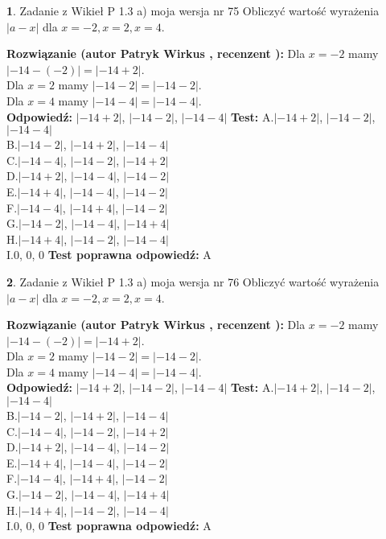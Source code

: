 \documentclass[12pt, a4paper]{article}
\theoremstyle{definition} %
\newtheorem{zad}{}
\newcommand{\zadStart}[1]{\begin{zad}#1\newline}
\newcommand{\zadStop}{\end{zad}}
\newcommand{\rozwStart}[2]{\noindent \textbf{Rozwiązanie (autor #1 , recenzent #2): }\newline}
\newcommand{\rozwStop}{\newline}
\newcommand{\odpStart}{\noindent \textbf{Odpowiedź:}\newline}
\newcommand{\odpStop}{\newline}
\newcommand{\testStart}{\noindent \textbf{Test:}\newline}
\newcommand{\testStop}{\newline}
\newcommand{\kluczStart}{\noindent \textbf{Test poprawna odpowiedź:}\newline}
\newcommand{\kluczStop}{\newline}
\begin{document}
\zadStart{Zadanie z Wikieł P 1.3 a) moja wersja nr 75}
Obliczyć wartość wyrażenia $|a - x|$ dla $x=-2,x=2,x=4$.
\zadStop
\rozwStart{Patryk Wirkus}{}
Dla $x = -2$ mamy $|-14 - (-2)| = |-14 + 2|$.\\
Dla $x = 2$ mamy $|-14 - 2| = |-14 - 2|$.\\
Dla $x = 4$ mamy $|-14 - 4| = |-14 - 4|$.\\
\rozwStop
\odpStart
$|-14 + 2|$, $|-14 - 2|$, $|-14 - 4|$
\odpStop
\testStart
A.$|-14 + 2|$, $|-14 - 2|$, $|-14 - 4|$\\
B.$|-14 - 2|$, $|-14 + 2|$, $|-14 - 4|$\\
C.$|-14 - 4|$, $|-14 - 2|$, $|-14 + 2|$\\
D.$|-14 + 2|$, $|-14 - 4|$, $|-14 - 2|$\\
E.$|-14 + 4|$, $|-14 - 4|$, $|-14 - 2|$\\
F.$|-14 - 4|$, $|-14 + 4|$, $|-14 - 2|$\\
G.$|-14 - 2|$, $|-14 - 4|$, $|-14 + 4|$\\
H.$|-14 + 4|$, $|-14 - 2|$, $|-14 - 4|$\\
I.$0$, $0$, $0$
\testStop
\kluczStart
A
\kluczStop



\zadStart{Zadanie z Wikieł P 1.3 a) moja wersja nr 76}
Obliczyć wartość wyrażenia $|a - x|$ dla $x=-2,x=2,x=4$.
\zadStop
\rozwStart{Patryk Wirkus}{}
Dla $x = -2$ mamy $|-14 - (-2)| = |-14 + 2|$.\\
Dla $x = 2$ mamy $|-14 - 2| = |-14 - 2|$.\\
Dla $x = 4$ mamy $|-14 - 4| = |-14 - 4|$.\\
\rozwStop
\odpStart
$|-14 + 2|$, $|-14 - 2|$, $|-14 - 4|$
\odpStop
\testStart
A.$|-14 + 2|$, $|-14 - 2|$, $|-14 - 4|$\\
B.$|-14 - 2|$, $|-14 + 2|$, $|-14 - 4|$\\
C.$|-14 - 4|$, $|-14 - 2|$, $|-14 + 2|$\\
D.$|-14 + 2|$, $|-14 - 4|$, $|-14 - 2|$\\
E.$|-14 + 4|$, $|-14 - 4|$, $|-14 - 2|$\\
F.$|-14 - 4|$, $|-14 + 4|$, $|-14 - 2|$\\
G.$|-14 - 2|$, $|-14 - 4|$, $|-14 + 4|$\\
H.$|-14 + 4|$, $|-14 - 2|$, $|-14 - 4|$\\
I.$0$, $0$, $0$
\testStop
\kluczStart
A
\kluczStop
\end{document}
